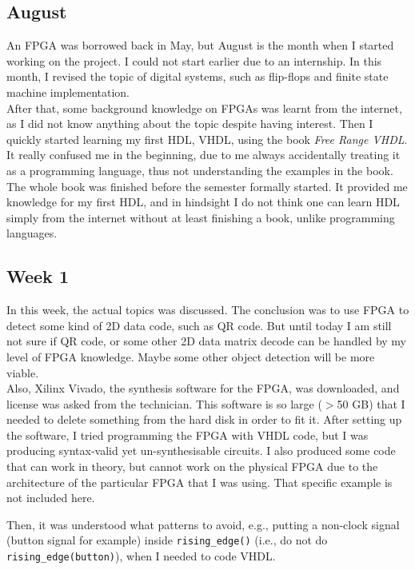 \documentclass{article}
\begin{document}
	\subsection{August}
		An FPGA was borrowed back in May, but August is the month when I started working on the project. I could not start earlier due to an internship. In this month, I revised the topic of digital systems, such as flip-flops and finite state machine implementation.
	\\
		
		After that, some background knowledge on FPGAs was learnt from the internet, as I did not know anything about the topic despite having interest. Then I quickly started learning my first HDL, VHDL, using the book \emph{Free Range VHDL}. It really confused me in the beginning, due to me always accidentally treating it as a programming language, thus not understanding the examples in the book. The whole book was finished before the semester formally started. It provided me knowledge for my first HDL, and in hindsight I do not think one can learn HDL simply from the internet without at least finishing a book, unlike programming languages.

	\subsection{Week 1}
		In this week, the actual topics was discussed. The conclusion was to use FPGA to detect some kind of 2D data code, such as QR code. But until today I am still not sure if QR code, or some other 2D data matrix decode can be handled by my level of FPGA knowledge. Maybe some other object detection will be more viable.
	\\
		
		Also, Xilinx Vivado, the synthesis software for the FPGA, was downloaded, and license was asked from the technician. This software is so large ($>$50 GB) that I needed to delete something from the hard disk in order to fit it. After setting up the software, I tried programming the FPGA with VHDL code, but I was producing syntax-valid yet un-synthesisable circuits. I also produced some code that can work in theory, but cannot work on the physical FPGA due to the architecture of the particular FPGA that I was using. That specific example is not included here.
		
		Then, it was understood what patterns to avoid, e.g., putting a non-clock signal (button signal for example) inside \texttt{rising\_edge()} (i.e., do not do \texttt{rising\_edge(button)}), when I needed to code VHDL.
	
\end{document}
